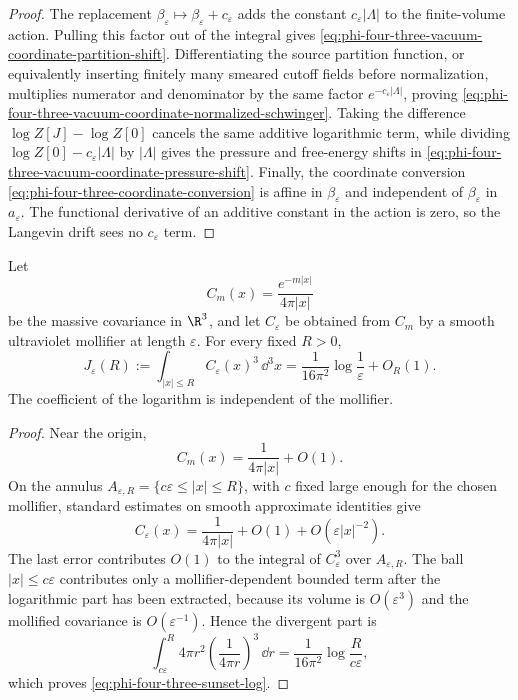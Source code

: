 \begin{proof}
The replacement
\(\beta_\varepsilon\mapsto\beta_\varepsilon+c_\varepsilon\) adds the constant
\(c_\varepsilon|\Lambda|\) to the finite-volume action.  Pulling this factor
out of the integral gives
\eqref{eq:phi-four-three-vacuum-coordinate-partition-shift}.  Differentiating
the source partition function, or equivalently inserting finitely many
smeared cutoff fields before normalization, multiplies numerator and
denominator by the same factor \(e^{-c_\varepsilon|\Lambda|}\), proving
\eqref{eq:phi-four-three-vacuum-coordinate-normalized-schwinger}.  Taking the
difference
\(\log Z[J]-\log Z[0]\) cancels the same additive logarithmic term, while
dividing \(\log Z[0]-c_\varepsilon|\Lambda|\) by \(|\Lambda|\) gives the
pressure and free-energy shifts in
\eqref{eq:phi-four-three-vacuum-coordinate-pressure-shift}.
Finally, the coordinate conversion
\eqref{eq:phi-four-three-coordinate-conversion} is affine in
\(\beta_\varepsilon\) and independent of \(\beta_\varepsilon\) in
\(a_\varepsilon\).  The functional derivative of an additive constant in the
action is zero, so the Langevin drift sees no \(c_\varepsilon\) term.
\end{proof}

\begin{lemma}
\label{lem:phi-four-three-sunset-logarithm}
Let
\[
  C_m(x)=\frac{e^{-m|x|}}{4\pi |x|}
\]
be the massive covariance in \(\R^3\), and let \(C_\varepsilon\) be obtained
from \(C_m\) by a smooth ultraviolet mollifier at length \(\varepsilon\).
For every fixed \(R>0\),
\begin{equation}
  J_\varepsilon(R)
  :=
  \int_{|x|\leq R} C_\varepsilon(x)^3\,\dd^3x
  =
  \frac{1}{16\pi^2}\log\frac1\varepsilon+O_R(1).
  \label{eq:phi-four-three-sunset-log}
\end{equation}
The coefficient of the logarithm is independent of the mollifier.
\end{lemma}

\begin{proof}
Near the origin,
\[
  C_m(x)=\frac{1}{4\pi |x|}+O(1).
\]
On the annulus \(A_{\varepsilon,R}=\{c\varepsilon\leq |x|\leq R\}\), with
\(c\) fixed large enough for the chosen mollifier, standard estimates on
smooth approximate identities give
\[
  C_\varepsilon(x)
  =
  \frac{1}{4\pi |x|}+O(1)+O(\varepsilon |x|^{-2}).
\]
The last error contributes \(O(1)\) to the integral of \(C_\varepsilon^3\)
over \(A_{\varepsilon,R}\).  The ball \(|x|\leq c\varepsilon\) contributes
only a mollifier-dependent bounded term after the logarithmic part has been
extracted, because its volume is \(O(\varepsilon^3)\) and the mollified
covariance is \(O(\varepsilon^{-1})\).  Hence the divergent part is
\[
  \int_{c\varepsilon}^{R}
  4\pi r^2
  \left(\frac{1}{4\pi r}\right)^3\,\dd r
  =
  \frac{1}{16\pi^2}
  \log\frac{R}{c\varepsilon},
\]
which proves \eqref{eq:phi-four-three-sunset-log}.
\end{proof}

